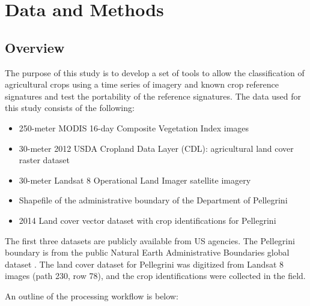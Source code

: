 \chapter{Data and Methods}
\label{chapter:methods}

\section{Overview}

The purpose of this study is to develop a set of tools to allow the classification of agricultural crops using a time series of imagery and known crop reference signatures and test the portability of the reference signatures. The data used for this study consists of the following:

\begin{Spacing}{1.2}
\begin{itemize}
  \item 250-meter MODIS 16-day Composite Vegetation Index images
  \item 30-meter 2012 USDA Cropland Data Layer (CDL): agricultural land cover raster dataset
  \item 30-meter Landsat 8 Operational Land Imager satellite imagery
  \item Shapefile of the administrative boundary of the Department of Pellegrini
  \item 2014 Land cover vector dataset with crop identifications for Pellegrini
\end{itemize}
\end{Spacing}

The first three datasets are publicly available from US agencies. The Pellegrini boundary is from the public Natural Earth Administrative Boundaries global dataset . The land cover dataset for Pellegrini was digitized from Landsat 8 images (path 230, row 78), and the crop identifications were collected in the field.

An outline of the processing workflow is below:

